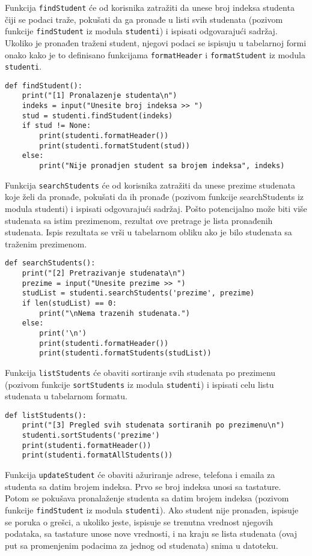\documentclass[a4paper]{article}
\begin{document}
Funkcija \texttt{findStudent} će od korisnika zatražiti da unese broj indeksa
studenta čiji se podaci traže, pokušati da ga pronađe u listi svih studenata
(pozivom funkcije \texttt{findStudent} iz modula \texttt{studenti}) i ispisati
odgovarajući sadržaj. Ukoliko je pronađen traženi student, njegovi podaci se
ispisuju u tabelarnoj formi onako kako je to definisano funkcijama
\texttt{formatHeader} i \texttt{formatStudent} iz modula \texttt{studenti}.

\begin{verbatim}
def findStudent():
    print("[1] Pronalazenje studenta\n")
    indeks = input("Unesite broj indeksa >> ")
    stud = studenti.findStudent(indeks)
    if stud != None:
        print(studenti.formatHeader())
        print(studenti.formatStudent(stud))
    else:
        print("Nije pronadjen student sa brojem indeksa", indeks)
\end{verbatim}

Funkcija \texttt{searchStudents} će od korisnika zatražiti da unese prezime
studenata koje želi da pronađe, pokušati da ih pronađe (pozivom funkcije
searchStudents iz modula studenti) i ispisati odgovarajući sadržaj. Pošto
potencijalno može biti više studenata sa istim prezimenom, rezultat ove pretrage
je lista pronađenih studenata. Ispis rezultata se vrši u tabelarnom obliku ako
je bilo studenata sa traženim prezimenom.

\begin{verbatim}
def searchStudents():
    print("[2] Pretrazivanje studenata\n")
    prezime = input("Unesite prezime >> ")
    studList = studenti.searchStudents('prezime', prezime)
    if len(studList) == 0:
        print("\nNema trazenih studenata.")
    else:
        print('\n')
        print(studenti.formatHeader())
        print(studenti.formatStudents(studList))
\end{verbatim}

Funkcija \texttt{listStudents} će obaviti sortiranje svih studenata po prezimenu
(pozivom funkcije \texttt{sortStudents} iz modula \texttt{studenti}) i ispisati
celu listu studenata u tabelarnom formatu.

\begin{verbatim}
def listStudents():
    print("[3] Pregled svih studenata sortiranih po prezimenu\n")
    studenti.sortStudents('prezime')
    print(studenti.formatHeader())
    print(studenti.formatAllStudents())
\end{verbatim}

Funkcija \texttt{updateStudent} će obaviti ažuriranje adrese, telefona i emaila
za studenta sa datim brojem indeksa. Prvo se broj indeksa unosi sa tastature.
Potom se pokušava pronalaženje studenta sa datim brojem indeksa (pozivom
funkcije \texttt{findStudent} iz modula \texttt{studenti}). Ako student nije
pronađen, ispisuje se poruka o grešci, a ukoliko jeste, ispisuje se trenutna
vrednost njegovih podataka, sa tastature unose nove vrednosti, i na kraju se
lista studenata (ovaj put sa promenjenim podacima za jednog od studenata) snima
u datoteku.
\end{document}
